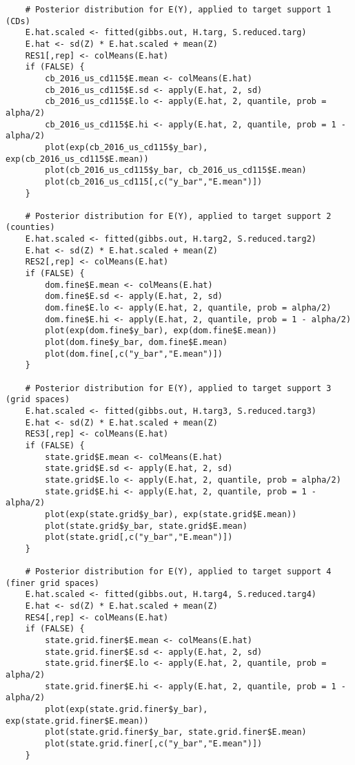 \documentclass[12pt]{article}
\begin{document}
\begin{scriptsize}
\begin{verbatim}
    # Posterior distribution for E(Y), applied to target support 1 (CDs)
    E.hat.scaled <- fitted(gibbs.out, H.targ, S.reduced.targ)
    E.hat <- sd(Z) * E.hat.scaled + mean(Z)
    RES1[,rep] <- colMeans(E.hat)
    if (FALSE) {
        cb_2016_us_cd115$E.mean <- colMeans(E.hat)
        cb_2016_us_cd115$E.sd <- apply(E.hat, 2, sd)
        cb_2016_us_cd115$E.lo <- apply(E.hat, 2, quantile, prob = alpha/2)
        cb_2016_us_cd115$E.hi <- apply(E.hat, 2, quantile, prob = 1 - alpha/2)
        plot(exp(cb_2016_us_cd115$y_bar), exp(cb_2016_us_cd115$E.mean))
        plot(cb_2016_us_cd115$y_bar, cb_2016_us_cd115$E.mean)
        plot(cb_2016_us_cd115[,c("y_bar","E.mean")])
    }
    
    # Posterior distribution for E(Y), applied to target support 2 (counties)
    E.hat.scaled <- fitted(gibbs.out, H.targ2, S.reduced.targ2)
    E.hat <- sd(Z) * E.hat.scaled + mean(Z)
    RES2[,rep] <- colMeans(E.hat)
    if (FALSE) {
        dom.fine$E.mean <- colMeans(E.hat)
        dom.fine$E.sd <- apply(E.hat, 2, sd)
        dom.fine$E.lo <- apply(E.hat, 2, quantile, prob = alpha/2)
        dom.fine$E.hi <- apply(E.hat, 2, quantile, prob = 1 - alpha/2)
        plot(exp(dom.fine$y_bar), exp(dom.fine$E.mean))
        plot(dom.fine$y_bar, dom.fine$E.mean)
        plot(dom.fine[,c("y_bar","E.mean")])
    }

    # Posterior distribution for E(Y), applied to target support 3 (grid spaces)
    E.hat.scaled <- fitted(gibbs.out, H.targ3, S.reduced.targ3)
    E.hat <- sd(Z) * E.hat.scaled + mean(Z)
    RES3[,rep] <- colMeans(E.hat)
    if (FALSE) {
        state.grid$E.mean <- colMeans(E.hat)
        state.grid$E.sd <- apply(E.hat, 2, sd)
        state.grid$E.lo <- apply(E.hat, 2, quantile, prob = alpha/2)
        state.grid$E.hi <- apply(E.hat, 2, quantile, prob = 1 - alpha/2)
        plot(exp(state.grid$y_bar), exp(state.grid$E.mean))
        plot(state.grid$y_bar, state.grid$E.mean)
        plot(state.grid[,c("y_bar","E.mean")])
    }

    # Posterior distribution for E(Y), applied to target support 4 (finer grid spaces)
    E.hat.scaled <- fitted(gibbs.out, H.targ4, S.reduced.targ4)
    E.hat <- sd(Z) * E.hat.scaled + mean(Z)
    RES4[,rep] <- colMeans(E.hat)
    if (FALSE) {
        state.grid.finer$E.mean <- colMeans(E.hat)
        state.grid.finer$E.sd <- apply(E.hat, 2, sd)
        state.grid.finer$E.lo <- apply(E.hat, 2, quantile, prob = alpha/2)
        state.grid.finer$E.hi <- apply(E.hat, 2, quantile, prob = 1 - alpha/2)
        plot(exp(state.grid.finer$y_bar), exp(state.grid.finer$E.mean))
        plot(state.grid.finer$y_bar, state.grid.finer$E.mean)
        plot(state.grid.finer[,c("y_bar","E.mean")])
    }


\end{verbatim}
\end{scriptsize}
\end{document}
